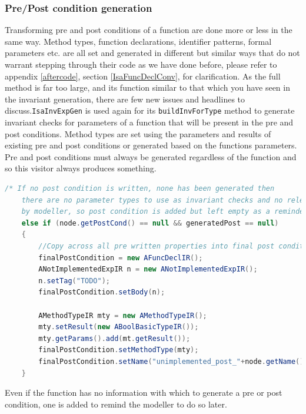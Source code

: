 	\subsubsection{Pre/Post condition generation}
	Transforming pre and post conditions of a function are done more or less in the same way. Method types, function declarations, identifier patterns, formal parameters etc. are all set and generated in different but similar ways that do not warrant stepping through their code as we have done before, please refer to appendix \ref{aftercode}, section \ref{IsaFuncDeclConv}, for clarification. As the full method is far too large, and its function similar to that which you have seen in the invariant generation, there are few new issues and headlines to discuss.\lstinline[language=Java]{IsaInvExpGen} is used again for its \lstinline[language=Java]{buildInvForType} method to generate invariant checks for parameters of a function that will be present in the pre and post conditions. Method types are set using the parameters and results of existing pre and post conditions or generated based on the functions parameters. Pre and post conditions must always be generated regardless of the function and so this visitor always produces something.
	\begin{lstlisting}[language=Java]
	/* If no post condition is written, none has been generated then
    there are no parameter types to use as invariant checks and no relevant checks provided
    by modeller, so post condition is added but left empty as a reminder to the modeller to add one later.*/
    else if (node.getPostCond() == null && generatedPost == null)
    {
    	//Copy across all pre written properties into final post condition.
    	finalPostCondition = new AFuncDeclIR();
    	ANotImplementedExpIR n = new ANotImplementedExpIR();
    	n.setTag("TODO");
    	finalPostCondition.setBody(n);
   
        AMethodTypeIR mty = new AMethodTypeIR();
        mty.setResult(new ABoolBasicTypeIR());
		mty.getParams().add(mt.getResult());
        finalPostCondition.setMethodType(mty);
    	finalPostCondition.setName("unimplemented_post_"+node.getName());
    }
	\end{lstlisting} 
	Even if the function has no information with which to generate a pre or post condition, one is added to remind the modeller to do so later.

